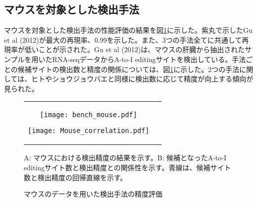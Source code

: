 \subsection{マウスを対象とした検出手法}
マウスを対象とした検出手法の性能評価の結果を図\ref{fig:mouse_data}に示した。紫丸で示したGu et al (2012)が最大の再現率、0.99を示した。また、3つの手法全てに共通して再現率が低いことが示された。Gu et al (2012)は、マウスの肝臓から抽出されたサンプルを用いたRNA-seqデータからA-to-I editingサイトを検出している。手法ごとの候補サイトの検出数と精度の関係については、図\ref{fig:mouse_data}に示した。2つの手法に関しては、ヒトやショウジョウバエと同様に検出数に応じて精度が向上する傾向が見られた。
\begin{figure}[htbp]
	\begin{tabular}{cc}
		\begin{minipage}{0.5\hsize}
				\centering
				\texttt{[image: bench\_mouse.pdf]}
				\label{fig:dmel_pr}
		\end{minipage}
		\begin{minipage}{0.5\hsize}
				\centering
				\texttt{[image: Mouse\_correlation.pdf]}
				\label{fig:dmel_cor}
		\end{minipage}
	\end{tabular}
	\caption{マウスのデータを用いた検出手法の精度評価}
	\vspace*{-0.2cm}
	\begin{flushleft}
		\small{A: マウスにおける検出精度の結果を示す。B: 候補となったA-to-I editingサイト数と検出精度との関係性を示す。青線は、候補サイト数と検出精度の回帰直線を示す。}
	\end{flushleft}
	\label{fig:mouse_data}
\end{figure}
